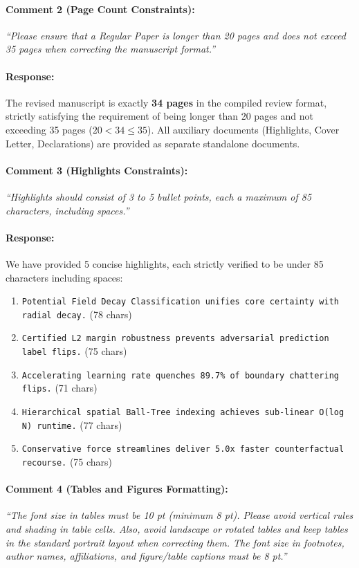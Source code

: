 \documentclass[10pt]{article}
\begin{document}
\paragraph{Comment 2 (Page Count Constraints):}
\textit{``Please ensure that a Regular Paper is longer than 20 pages and does not exceed 35 pages when correcting the manuscript format.''}

\paragraph{Response:}
The revised manuscript is exactly \textbf{34 pages} in the compiled review format, strictly satisfying the requirement of being longer than 20 pages and not exceeding 35 pages ($20 < 34 \le 35$). All auxiliary documents (Highlights, Cover Letter, Declarations) are provided as separate standalone documents.

\paragraph{Comment 3 (Highlights Constraints):}
\textit{``Highlights should consist of 3 to 5 bullet points, each a maximum of 85 characters, including spaces.''}

\paragraph{Response:}
We have provided 5 concise highlights, each strictly verified to be under 85 characters including spaces:
\begin{enumerate}
    \item \texttt{Potential Field Decay Classification unifies core certainty with radial decay.} (78 chars)
    \item \texttt{Certified L2 margin robustness prevents adversarial prediction label flips.} (75 chars)
    \item \texttt{Accelerating learning rate quenches 89.7\% of boundary chattering flips.} (71 chars)
    \item \texttt{Hierarchical spatial Ball-Tree indexing achieves sub-linear O(log N) runtime.} (77 chars)
    \item \texttt{Conservative force streamlines deliver 5.0x faster counterfactual recourse.} (75 chars)
\end{enumerate}

\paragraph{Comment 4 (Tables and Figures Formatting):}
\textit{``The font size in tables must be 10 pt (minimum 8 pt). Please avoid vertical rules and shading in table cells. Also, avoid landscape or rotated tables and keep tables in the standard portrait layout when correcting them. The font size in footnotes, author names, affiliations, and figure/table captions must be 8 pt.''}
\end{document}
